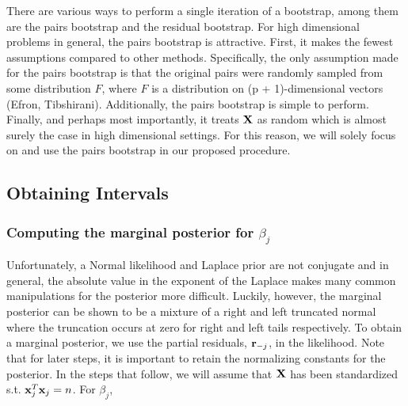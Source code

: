 There are various ways to perform a single iteration of a bootstrap, among them are the pairs bootstrap and the residual bootstrap. For high dimensional problems in general, the pairs bootstrap is attractive. First, it makes the fewest assumptions compared to other methods. Specifically, the only assumption made for the pairs bootstrap is that the original pairs were randomly sampled from some distribution $F$, where $F$ is a distribution on (p + 1)-dimensional vectors (Efron, Tibshirani). Additionally, the pairs bootstrap is simple to perform. Finally, and perhaps most importantly, it treats $\mathbf{X}$ as random which is almost surely the case in high dimensional settings. For this reason, we will solely focus on and use the pairs bootstrap in our proposed procedure.

\subsection{Obtaining Intervals}

\subsubsection{Computing the marginal posterior for $\beta_j$}


Unfortunately, a Normal likelihood and Laplace prior are not conjugate and in general, the absolute value in the exponent of the Laplace makes many common manipulations for the posterior more difficult. Luckily, however, the marginal posterior can be shown to be a mixture of a right and left truncated normal where the truncation occurs at zero for right and left tails respectively. To obtain a marginal posterior, we use the partial residuals, $\mathbf{r}_{-j}$, in the likelihood. Note that for later steps, it is important to retain the normalizing constants for the posterior. In the steps that follow, we will assume that $\mathbf{X}$ has been standardized s.t. $\mathbf{x}_j^T\mathbf{x}_j = n$. For $\beta_j$,

